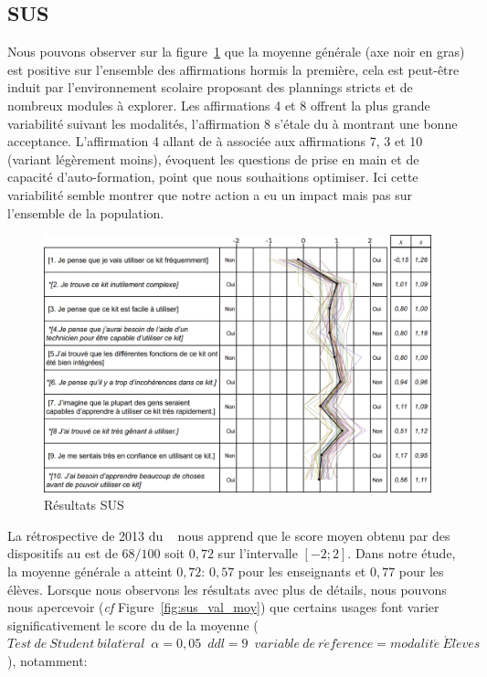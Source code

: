     \subsection{SUS}
        Nous pouvons observer sur la figure~\ref{fig:sus_chemin} que la moyenne générale (axe noir en gras) est positive sur l'ensemble des affirmations hormis la première, cela est peut-être induit par l'environnement scolaire proposant des plannings stricts et de nombreux modules à explorer.
        Les affirmations 4 et 8 offrent la plus grande variabilité suivant les modalités, l'affirmation 8 s'étale du  à  montrant une bonne acceptance.
        L'affirmation 4 allant de  à  associée aux affirmations 7, 3 et 10 (variant légèrement moins), évoquent les questions de prise en main et de capacité d'auto-formation, point que nous souhaitions optimiser.
        Ici cette variabilité semble montrer que notre action a eu un impact mais pas sur l'ensemble de la population.
        \begin{figure}[!h]
            \centering
            \includegraphics[width=0.9\linewidth]{Figures/Desprez_didapro-sus_chemin.png}
            \caption{Résultats SUS~}\label{fig:sus_chemin}
        \end{figure}
        La rétrospective de 2013 du ~ nous apprend que le score moyen obtenu par des dispositifs au  est de $68/100$ soit $0,72$ sur l'intervalle $[-2;2]$.
        Dans notre étude, la moyenne générale a atteint $0,72$: $0,57$ pour les enseignants et $0,77$ pour les élèves.
        Lorsque nous observons les résultats avec plus de détails, nous pouvons nous apercevoir (\textit{cf} Figure~\ref{fig:sus_val_moy}) que certains usages font varier significativement le score du  de la moyenne ($Test\ de\ Student\ bilat\acute{e}ral\;\ \alpha=0,05\;\ ddl=9\;\ variable\ de\ r\acute{e}f\acute{e}rence=modalit\acute{e}\ \acute{E}l\grave{e}ves$), notamment:
